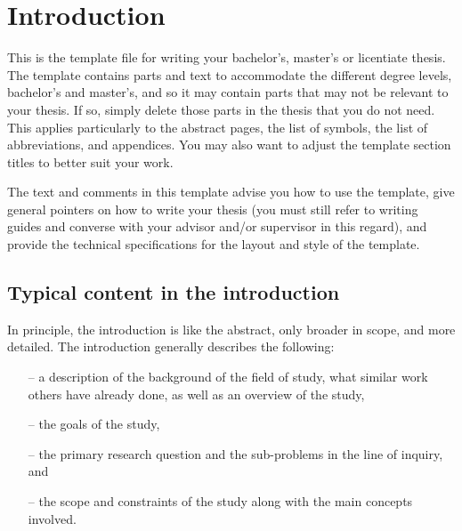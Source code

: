\documentclass[english, 12pt, a4paper, sci, utf8, a-2b, online]{aaltothesis}
\begin{document}
\cleardoublepage

\section{Introduction}
\label{sec:intro}

\thispagestyle{empty}

This is the template file for writing your bachelor’s, master’s or licentiate 
thesis. The template contains parts and text to accommodate the different degree 
levels, bachelor’s and master’s, and so it may contain parts that may not be 
relevant to your thesis. If so, simply delete those parts in the thesis that you
do not need. This applies particularly to the abstract pages, the list of
symbols, the list of abbreviations, and appendices. You may also want to adjust
the template section titles to better suit your work.

The text and comments in this template advise you how to use the template, give 
general pointers on how to write your thesis (you must still refer to writing
guides and converse with your advisor and/or supervisor in this regard), and
provide the technical specifications for the layout and style of the template.

\subsection{Typical content in the introduction}

In principle, the introduction is like the abstract, only broader in scope, and
more detailed. The introduction generally describes the following:

\begin{itemize}
	\item[--] a description of the background of the field of study, what
	similar work others have already done, as well as an overview of the study,
	\item[--] the goals of the study,
	\item[--] the primary research question and the sub-problems in the line
	of inquiry, and
	\item[--] the scope and constraints of the study along with the main
	concepts involved.
\end{itemize}
\end{document}
